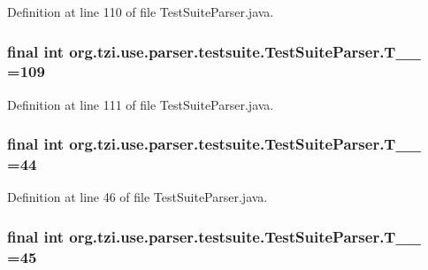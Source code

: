 Definition at line 110 of file Test\-Suite\-Parser.\-java.

\hypertarget{classorg_1_1tzi_1_1use_1_1parser_1_1testsuite_1_1_test_suite_parser_adc854d4dee6e4fb7a9dad65a6c1bdffb}{
\subsubsection[{T\-\_\-\-\_\-109}]{\setlength{\rightskip}{0pt plus 5cm}final int org.\-tzi.\-use.\-parser.\-testsuite.\-Test\-Suite\-Parser.\-T\-\_\-\-\_ =109\hspace{0.3cm}{\ttfamily [static]}}}\label{classorg_1_1tzi_1_1use_1_1parser_1_1testsuite_1_1_test_suite_parser_adc854d4dee6e4fb7a9dad65a6c1bdffb}


Definition at line 111 of file Test\-Suite\-Parser.\-java.

\hypertarget{classorg_1_1tzi_1_1use_1_1parser_1_1testsuite_1_1_test_suite_parser_a46f9c9c87de4c840f5c45f4f92a27a65}{
\subsubsection[{T\-\_\-\-\_\-44}]{\setlength{\rightskip}{0pt plus 5cm}final int org.\-tzi.\-use.\-parser.\-testsuite.\-Test\-Suite\-Parser.\-T\-\_\-\-\_ =44\hspace{0.3cm}{\ttfamily [static]}}}\label{classorg_1_1tzi_1_1use_1_1parser_1_1testsuite_1_1_test_suite_parser_a46f9c9c87de4c840f5c45f4f92a27a65}


Definition at line 46 of file Test\-Suite\-Parser.\-java.

\hypertarget{classorg_1_1tzi_1_1use_1_1parser_1_1testsuite_1_1_test_suite_parser_adafd571624b826beb2972b999d5de3e8}{
\subsubsection[{T\-\_\-\-\_\-45}]{\setlength{\rightskip}{0pt plus 5cm}final int org.\-tzi.\-use.\-parser.\-testsuite.\-Test\-Suite\-Parser.\-T\-\_\-\-\_ =45\hspace{0.3cm}{\ttfamily [static]}}}\label{classorg_1_1tzi_1_1use_1_1parser_1_1testsuite_1_1_test_suite_parser_adafd571624b826beb2972b999d5de3e8}


